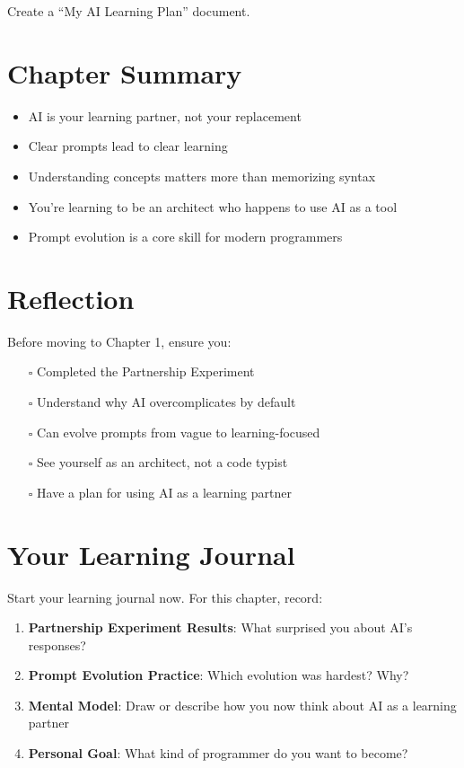 \documentclass[
  letterpaper,
  DIV=11,
  numbers=noendperiod,
  oneside]{scrreprt}
\providecommand{\tightlist}{%
  \setlength{\itemsep}{0pt}\setlength{\parskip}{0pt}}\usepackage{longtable,booktabs,array}
\begin{document}
Create a ``My AI Learning Plan'' document.

\section{Chapter Summary}\label{chapter-summary}

\begin{itemize}
\tightlist
\item
  AI is your learning partner, not your replacement
\item
  Clear prompts lead to clear learning
\item
  Understanding concepts matters more than memorizing syntax
\item
  You're learning to be an architect who happens to use AI as a tool
\item
  Prompt evolution is a core skill for modern programmers
\end{itemize}

\section{Reflection}\label{reflection}

Before moving to Chapter 1, ensure you:

\begin{itemize}
\tightlist
\item[$\square$]
  Completed the Partnership Experiment
\item[$\square$]
  Understand why AI overcomplicates by default
\item[$\square$]
  Can evolve prompts from vague to learning-focused
\item[$\square$]
  See yourself as an architect, not a code typist
\item[$\square$]
  Have a plan for using AI as a learning partner
\end{itemize}

\section{Your Learning Journal}\label{your-learning-journal}

Start your learning journal now. For this chapter, record:

\begin{enumerate}
\def\labelenumi{\arabic{enumi}.}
\tightlist
\item
  \textbf{Partnership Experiment Results}: What surprised you about AI's
  responses?
\item
  \textbf{Prompt Evolution Practice}: Which evolution was hardest? Why?
\item
  \textbf{Mental Model}: Draw or describe how you now think about AI as
  a learning partner
\item
  \textbf{Personal Goal}: What kind of programmer do you want to become?
\end{enumerate}
\end{document}
